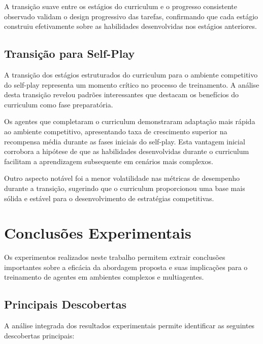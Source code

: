 A transição suave entre os estágios do curriculum e o progresso consistente observado validam o design progressivo das tarefas, confirmando que cada estágio construiu efetivamente sobre as habilidades desenvolvidas nos estágios anteriores.

\subsection{Transição para Self-Play}

A transição dos estágios estruturados do curriculum para o ambiente competitivo do self-play representa um momento crítico no processo de treinamento. A análise desta transição revelou padrões interessantes que destacam os benefícios do curriculum como fase preparatória.

Os agentes que completaram o curriculum demonstraram adaptação mais rápida ao ambiente competitivo, apresentando taxa de crescimento superior na recompensa média durante as fases iniciais do self-play. Esta vantagem inicial corrobora a hipótese de que as habilidades desenvolvidas durante o curriculum facilitam a aprendizagem subsequente em cenários mais complexos.

Outro aspecto notável foi a menor volatilidade nas métricas de desempenho durante a transição, sugerindo que o curriculum proporcionou uma base mais sólida e estável para o desenvolvimento de estratégias competitivas.

\section{Conclusões Experimentais}
\label{sec:conclusoes_experimentais}

Os experimentos realizados neste trabalho permitem extrair conclusões importantes sobre a eficácia da abordagem proposta e suas implicações para o treinamento de agentes em ambientes complexos e multiagentes.

\subsection{Principais Descobertas}

A análise integrada dos resultados experimentais permite identificar as seguintes descobertas principais:

